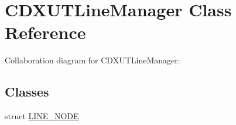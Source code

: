 \hypertarget{class_c_d_x_u_t_line_manager}{\section{C\+D\+X\+U\+T\+Line\+Manager Class Reference}
\label{class_c_d_x_u_t_line_manager}
}


Collaboration diagram for C\+D\+X\+U\+T\+Line\+Manager\+:
\subsection*{Classes}
\begin{DoxyCompactItemize}
\item 
struct \hyperlink{struct_c_d_x_u_t_line_manager_1_1_l_i_n_e___n_o_d_e}{L\+I\+N\+E\+\_\+\+N\+O\+D\+E}
\end{DoxyCompactItemize}
